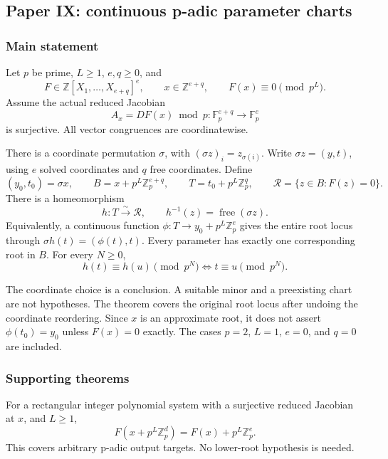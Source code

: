 \hypertarget{cont5:paper-ix-continuous-p-adic-parameter-charts}{%
\subsection{Paper IX: continuous p-adic parameter
charts}\label{cont5:paper-ix-continuous-p-adic-parameter-charts}}

\hypertarget{cont5:main-statement}{%
\subsubsection{Main statement}\label{cont5:main-statement}}

Let \(p\) be prime, \(L\ge1\), \(e,q\ge0\), and \[
F\in\mathbb Z[X_1,\ldots,X_{e+q}]^e,\qquad
x\in\mathbb Z^{e+q},\qquad F(x)\equiv0\pmod{p^L}.
\] Assume the actual reduced Jacobian \[
A_x=DF(x)\bmod p:\mathbb F_p^{e+q}\longrightarrow\mathbb F_p^e
\] is surjective. All vector congruences are coordinatewise.

There is a coordinate permutation \(\sigma\), with
\((\sigma z)_i=z_{\sigma(i)}\). Write \(\sigma z=(y,t)\), using \(e\)
solved coordinates and \(q\) free coordinates. Define \[
(y_0,t_0)=\sigma x,\qquad
B=x+p^L\mathbb Z_p^{e+q},\qquad
T=t_0+p^L\mathbb Z_p^q,\qquad
\mathcal R=\{z\in B:F(z)=0\}.
\] There is a homeomorphism \[
h:T\xrightarrow{\ \sim\ }\mathcal R,\qquad
h^{-1}(z)=\operatorname{free}(\sigma z).
\] Equivalently, a continuous function
\(\phi:T\to y_0+p^L\mathbb Z_p^e\) gives the entire root locus through
\(\sigma h(t)=(\phi(t),t)\). Every parameter has exactly one
corresponding root in \(B\). For every \(N\ge0\), \[
\boxed{h(t)\equiv h(u)\pmod{p^N}\iff t\equiv u\pmod{p^N}.}
\]

The coordinate choice is a conclusion. A suitable minor and a
preexisting chart are not hypotheses. The theorem covers the original
root locus after undoing the coordinate reordering. Since \(x\) is an
approximate root, it does not assert \(\phi(t_0)=y_0\) unless \(F(x)=0\)
exactly. The cases \(p=2\), \(L=1\), \(e=0\), and \(q=0\) are included.

\hypertarget{cont5:supporting-theorems}{%
\subsubsection{Supporting theorems}\label{cont5:supporting-theorems}}

For a rectangular integer polynomial system with a surjective reduced
Jacobian at \(x\), and \(L\ge1\), \[
F(x+p^L\mathbb Z_p^d)=F(x)+p^L\mathbb Z_p^e.
\] This covers arbitrary p-adic output targets. No lower-root hypothesis
is needed.

